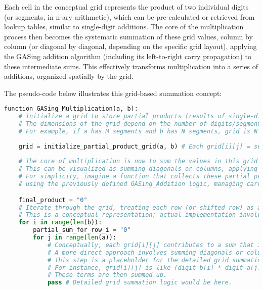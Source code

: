 Each cell in the conceptual grid represents the product of two individual digits (or segments, in n-ary arithmetic), which can be pre-calculated or retrieved from lookup tables, similar to single-digit additions. The core of the multiplication process then becomes the systematic summation of these grid values, column by column (or diagonal by diagonal, depending on the specific grid layout), applying the GASing addition algorithm (including its left-to-right carry propagation) to these intermediate sums. This effectively transforms multiplication into a series of additions, organized spatially by the grid.

The pseudo-code below illustrates this grid-based summation concept:



\begin{lstlisting}[language=Python,caption={GASing\_Multiplication Algorithm}]
function GASing_Multiplication(a, b):
    # Initialize a grid to store partial products (results of single-digit multiplications)
    # The dimensions of the grid depend on the number of digits/segments in a and b.
    # For example, if a has M segments and b has N segments, grid is N x M.
        
    grid = initialize_partial_product_grid(a, b) # Each grid[i][j] = segment_b[i] * segment_a[j]
        
    # The core of multiplication is now to sum the values in this grid in a structured way.
    # This can be visualized as summing diagonals or columns, applying GASing addition.
    # For simplicity, imagine a function that collects these partial products and sums them
    # using the previously defined GASing_Addition logic, managing carries appropriately.

    final_product = "0"
    # Iterate through the grid, treating each row (or shifted row) as a number to be added.
    # This is a conceptual representation; actual implementation involves careful alignment and summation.
    for i in range(len(b)):
        partial_sum_for_row_i = "0"
        for j in range(len(a)):
            # Conceptually, each grid[i][j] contributes to a sum that is then added.
            # A more direct approach involves summing diagonals or columns with carries.
            # This step is a placeholder for the detailed grid summation logic.
            # For instance, grid[i][j] is like (digit_b[i] * digit_a[j]) * 10^(position_factor)
            # These terms are then summed up.
            pass # Detailed grid summation logic would be here.


\end{lstlisting}
